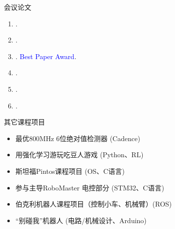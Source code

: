 \documentclass{resume} %
\begin{document}
\begin{rSection}{会议论文}
    
    \begin{enumerate}
         \item {}.
         \item {}.
         \item {}. \textcolor{blue}{Best Paper Award}.
        \item {}.
        \item {}.
        \item {}.
    \end{enumerate}
\end{rSection}

\begin{rSection}{其它课程项目}
    \begin{multicols}{2} 
    \begin{itemize}
        \item 最优800MHz 6位绝对值检测器 (Cadence)
        \item 用强化学习游玩吃豆人游戏 (Python、RL) 
        \item 斯坦福Pintos课程项目 (OS、C语言)
        \item 参与主导RoboMaster 电控部分 (STM32、C语言)
        \item 伯克利机器人课程项目（控制小车、机械臂）(ROS) %
        \item ``别碰我''机器人 (电路/机械设计、Arduino)
    \end{itemize}
    \end{multicols}  %
    \vspace{-5mm}
\end{rSection}
\end{document}
